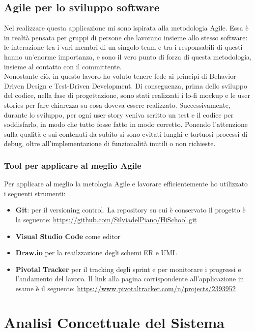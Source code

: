\documentclass[Lau, binding=0.6cm, oneside]{sapthesis}
\begin{document}
\section{Agile per lo sviluppo software} \label{agile}

Nel realizzare questa applicazione mi sono ispirata alla metodologia Agile. Essa è in realtà pensata per gruppi di persone che lavorano insieme allo stesso software: le interazione tra i vari membri di un singolo team e tra i responsabili di questi hanno un'enorme importanza, e sono il vero punto di forza di questa metodologia, insieme al contatto con il committente.\\
Nonostante ciò, in questo lavoro ho voluto tenere fede ai principi di Behavior-Driven Design e Test-Driven Development. Di conseguenza, prima dello sviluppo del codice, nella fase di progettazione, sono stati realizzati i lo-fi mockup e le user stories per fare chiarezza su cosa doveva essere realizzato. Successivamente, durante lo sviluppo, per ogni user story veniva scritto un test e il codice per soddisfarlo, in modo che tutto fosse fatto in modo corretto. Ponendo l'attenzione sulla qualità e sui contenuti da subito si sono evitati lunghi e tortuosi processi di debug, oltre all'implementazione di funzionalità inutili o non richieste.

\subsection{Tool per applicare al meglio Agile}

Per applicare al meglio la metologia Agile e lavorare efficientemente ho utilizzato i seguenti strumenti:

\begin{itemize}
	\item \textbf{Git}: per il versioning control. La repository su cui è conservato il progetto è la seguente: \url{https://github.com/SilviadelPiano/HiSchool.git}
	\item \textbf{Visual Studio Code} come editor
	\item \textbf{Draw.io} per la reailzzazione degli schemi ER e UML
	\item \textbf{Pivotal Tracker} per il tracking degli sprint e per monitorare i progressi e l'andamento del lavoro. Il link alla pagina corrispondente all'applicazione in esame è il seguente: \url{https://www.pivotaltracker.com/n/projects/2393952}
\end{itemize}

\chapter{Analisi Concettuale del Sistema}
\end{document}
